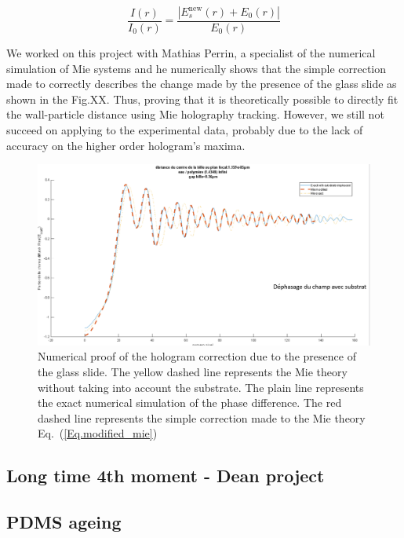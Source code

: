 \begin{equation}
	\frac{I(r)}{I_0(r)} = \frac{|E_s^\mathrm{new}(r) + E_0(r)|}{E_0(r)}
	\label{Eq.modified_mie}
\end{equation}

We worked on this project with Mathias Perrin, a specialist of the numerical simulation of Mie systems and he numerically shows that the simple correction made to correctly describes the change made by the presence of the glass slide as shown in the Fig.XX. Thus, proving that it is theoretically possible to directly fit the wall-particle distance using Mie holography tracking. However, we still not succeed on applying to the experimental data, probably due to the lack of accuracy on the higher order hologram's maxima.

\begin{figure}[H]
	\centering
	\includegraphics[scale=0.5]{02_body/chapter4/images/h_measurement/simulation_glass_correction.png}
	\caption{Numerical proof of the hologram correction due to the presence of the glass slide. The yellow dashed line represents the Mie theory without taking into account the substrate. The plain line represents the exact numerical simulation of the phase difference. The red dashed line represents the simple correction made to the Mie theory Eq.~(\ref{Eq.modified_mie})}
	\label{fig.glass_correction}
\end{figure}

\subsection{Long time 4th moment - Dean project}
\subsection{PDMS ageing}

